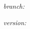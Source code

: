 \begin{titlepage}
\begin{center}
\vfill

{\large \coupidate}

\end{center}
{\hfill\textit{branch:} \branchname}

{\hfill\textit{version:} \coupiversion}

\end{titlepage}
